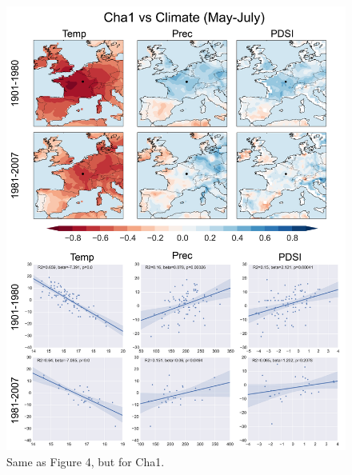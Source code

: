 \documentclass[12pt]{article}
\begin{document}
\begin{figure}
\center
\includegraphics[width=.9\columnwidth,scale=2]{SUPP_fig_07_Cha1_MJJ_climate_onedeg.png}
\caption{Same as Figure 4, but for Cha1.}
\end{figure}
\end{document}
